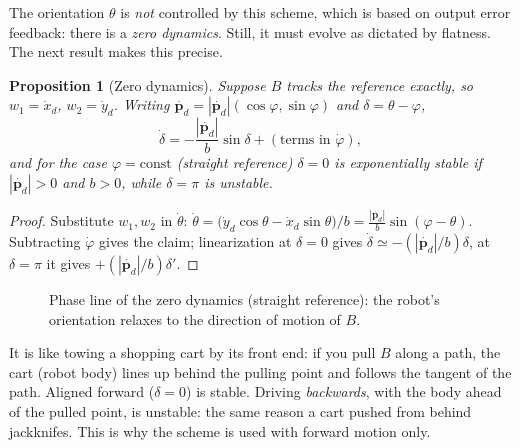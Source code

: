 \documentclass[11pt,a4paper]{article}
\newcommand{\vect}[1]{\bm{#1}}
\newcommand{\pd}{\vect{p}_d}
\theoremstyle{plain}
\newtheorem{proposition}[theorem]{Proposition}
\theoremstyle{definition}
\theoremstyle{remark}
\begin{document}
The orientation $\theta$ is \emph{not} controlled by this scheme, which is based on output error feedback: there is a \emph{zero dynamics}. Still, it must evolve as dictated by flatness. The next result makes this precise.

\begin{proposition}[Zero dynamics]\label{prop:zerodyn}
Suppose $B$ tracks the reference exactly, so $w_1=\dot x_d$, $w_2=\dot y_d$. Writing $\dot{\pd}=|\dot{\pd}|(\cos\varphi,\sin\varphi)$ and $\delta=\theta-\varphi$,
\[
\dot\delta=-\frac{|\dot{\pd}|}{b}\sin\delta+(\text{terms in }\dot\varphi),
\]
and for the case $\varphi=\text{const}$ (straight reference) $\delta=0$ is exponentially stable if $|\dot{\pd}|>0$ and $b>0$, while $\delta=\pi$ is unstable.
\end{proposition}
\begin{proof}
Substitute $w_1,w_2$ in $\dot\theta$: $\dot\theta=\bigl(\dot y_d\cos\theta-\dot x_d\sin\theta\bigr)/b=\frac{|\dot{\pd}|}{b}\sin(\varphi-\theta)$. Subtracting $\dot\varphi$ gives the claim; linearization at $\delta=0$ gives $\dot\delta\simeq-(|\dot{\pd}|/b)\delta$, at $\delta=\pi$ it gives $+(|\dot{\pd}|/b)\delta'$.
\end{proof}

\begin{figure}[H]
\centering
{}
\caption{Phase line of the zero dynamics (straight reference): the robot's orientation relaxes to the direction of motion of $B$.}
\end{figure}

\begin{intuition}
It is like towing a shopping cart by its front end: if you pull $B$ along a path, the cart (robot body) lines up behind the pulling point and follows the tangent of the path. Aligned forward ($\delta=0$) is stable. Driving \emph{backwards}, with the body ahead of the pulled point, is unstable: the same reason a cart pushed from behind jackknifes. This is why the scheme is used with forward motion only.
\end{intuition}
\end{document}
